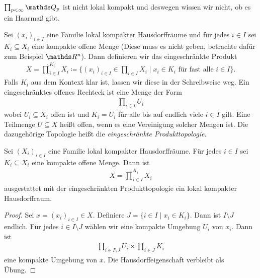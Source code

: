 \begin{bsp}
$\prod_{p <\infty} \Q_p$ ist nicht lokal kompakt und deswegen wissen wir nicht, ob es ein Haarmaß gibt.
\end{bsp}

\begin{defi}
Sei $(x_i)_{ i \in I}$ eine Familie lokal kompakter Hausdorffräume und für jedes $i \in I$ sei $K_i\subseteq X_i$ eine kompakte offene Menge
(Diese muss es nicht geben, betrachte dafür zum Beispiel $\Rn$).
Dann definieren wir das eingeschränkte Produkt
\begin{align*}
X=\hat{\prod}_{i\in I}^{K_i} X_i \coloneqq \{(x_i)_{i \in I} \in \prod_{i \in I} X_i \mid x_i \in K_i \text{ für fast alle } i \in I\}.
\end{align*}
Falls $K_i$ aus dem Kontext klar ist, lassen wir diese in der Schreibweise weg.
Ein eingeschränktes offenes Rechteck ist eine Menge der Form
\begin{align*}
\prod_{i\in I} U_i
\end{align*}
wobei $U_i \subseteq X_i$ offen ist und $K_i=U_i$ für alle bis auf endlich viele $i  \in I$ gilt.
Eine Teilmenge $U\subseteq X$ heißt offen, wenn es eine Vereinigung solcher Mengen ist.
Die dazugehörige Topologie heißt die \emph{eingeschränkte Produkttopologie}.
\end{defi}

\begin{prop}
Sei $(X_i)_{i\in I}$ eine Familie lokal kompakter Hausdorffräume.
Für jedes $i \in I$ sei $K_i\subseteq X_i$ eine kompakte offene Menge.
Dann ist
\begin{align*}
X=\hat{\prod}_{i \in I}^{K_i} X_i
\end{align*}
ausgestattet mit der eingeschränkten Produkttopologie ein lokal kompakter Hausdorffraum.
\end{prop}

\begin{proof}
Sei $x=(x_i)_{i \in I} \in X$. Definiere $J=\{i \in I \mid x_i \in K_i\}$. Dann ist $I\setminus J$ endlich. Für jedes $i \in I\setminus J$ wählen wir eine kompakte Umgebung $U_i$ von $x_i$.
Dann ist
\begin{align*}
\prod_{i\in I\setminus J} U_i \times \prod_{i\in J} K_i
\end{align*}
eine kompakte Umgebung von $x$.
Die Hausdorffeigenschaft verbleibt als Übung.
\end{proof}

